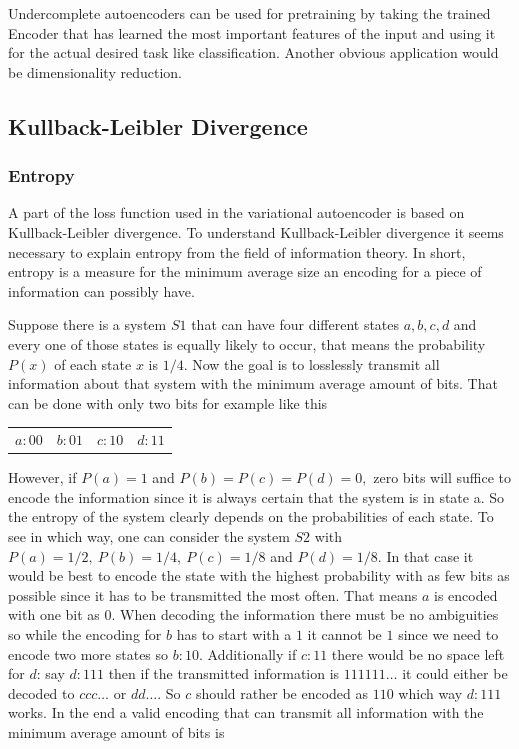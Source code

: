 Undercomplete autoencoders can be used for pretraining by taking the trained Encoder that has 
learned the most important features of the input and using it for the actual desired task like 
classification. Another obvious application would be dimensionality reduction.

\subsection{Kullback-Leibler Divergence} \label{KL-Divergence}

\subsubsection{Entropy}

A part of the loss function used in the variational autoencoder is based on Kullback-Leibler divergence.
To understand Kullback-Leibler divergence it seems necessary to explain entropy from
the field of information theory. In short, entropy is a measure for the minimum average size an
encoding for a piece of information can possibly have.

Suppose there is a system $S1$ that can have four different states $a, b, c, d$
and every one of those states is equally likely to occur, that means the probability $P(x)$
of each state $x$ is $1/4$. Now the goal is to losslessly transmit all information about that system
with the minimum average amount of bits. That can be done with only two bits for example like this

\begin{center}
    \begin{tabular} {c c c c}
        $a: 00$ & $b: 01$ & $c: 10$ & $d: 11$
    \end{tabular}
\end{center}

However, if $P(a)=1$ and $P(b)=P(c)=P(d)=0,$ zero bits will suffice to encode the information since
it is always certain that the system is in state a. So the entropy of the system clearly depends on
the probabilities of each state. To see in which way, one can consider the system $S2$ with 
$P(a)=1/2,\ P(b)=1/4,\ P(c)=1/8$ and $P(d)=1/8$. In that case it would be best to encode the state
with the highest probability with as few bits as possible since it has to be transmitted the most
often. That means $a$ is encoded with one bit as $0$. When decoding the information there must be
no ambiguities so while the encoding for $b$ has to start with a $1$ it cannot be $1$ since we need 
to encode two more states so $b: 10$. Additionally if $c: 11$ there would be no space left for $d$:
say $d: 111$ then if the transmitted information is $111111\dots$ it could either be decoded to
$ccc\dots$ or $dd\dots$. So $c$ should rather be encoded as $110$ which way $d: 111$ works. In the end a valid
encoding that can transmit all information with the minimum average amount of bits is


